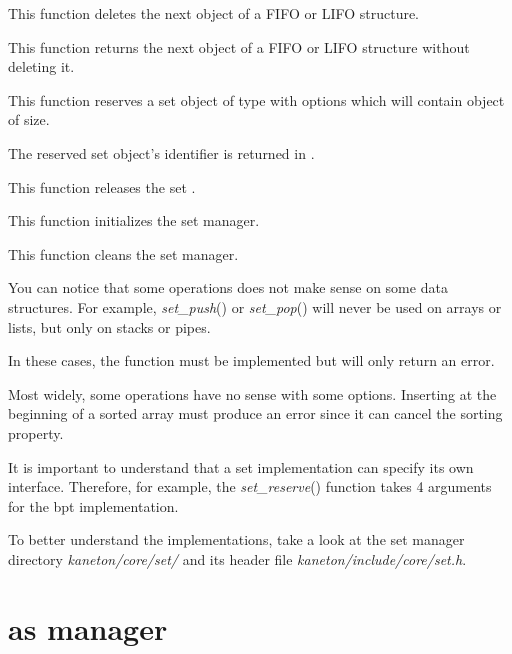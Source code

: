 	 {
	   This function deletes the next object of a FIFO or LIFO structure.
	 }

	 {
	   This function returns the next object of a FIFO or LIFO structure
	   without deleting it.
	 }

	 {
	   This function reserves a set object of type 
	   with options  which will contain object of
	    size.

	   The reserved set object's identifier is returned in
	   .
	 }

	 {
	   This function releases the set .
	 }

	 {
	   This function initializes the set manager.
	 }

	 {
	   This function cleans the set manager.
	 }

You can notice that some operations does not make sense on some data
structures. For example, \textit{set\_push}() or \textit{set\_pop}()
will never be used on arrays or lists, but only on stacks or pipes.

In these cases, the function must be implemented but will only return
an error.

Most widely, some operations have no sense with some options. Inserting
at the beginning of a sorted array must produce an error since it can
cancel the sorting property.

It is important to understand that a set implementation can specify
its own interface. Therefore, for example, the \textit{set\_reserve}()
function takes 4 arguments for the bpt implementation.

To better understand the implementations, take a look at the set
manager directory \textit{kaneton/core/set/} and its header file
\textit{kaneton/include/core/set.h}.

%
%

\section{as manager}

